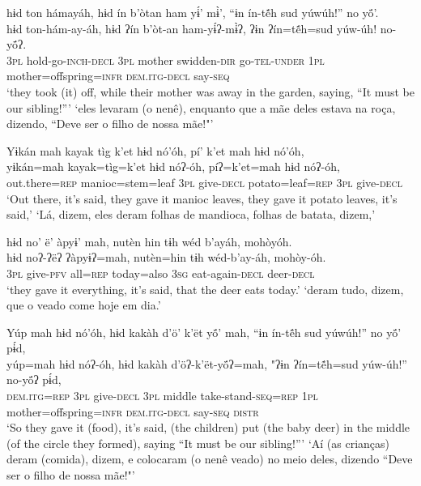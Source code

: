 \documentclass[output=paper,
modfonts,nonflat
]{langsci/langscibook}
\begin{document}
\ea  hɨd ton hámayáh, hɨd ín b’òtan ham yɨ́’ mɨ̀’, “ɨn ín-tẽ́h sud yúwúh!” no yö́’.\\
\gll hɨd ton-hám-ay-áh, hɨd ʔín b’òt-an ham-yɨ́ʔ-mɨ̀ʔ, ʔɨn ʔín=tẽ́h=sud yúw-úh! no-yö́ʔ.\\
     \textsc{3pl} hold-go\textsc{-inch-decl} \textsc{3pl} mother swidden\textsc{-dir} go\textsc{-tel-under} \textsc{1pl} mother=offspring\textsc{=infr} \textsc{dem.itg-decl} say\textsc{-seq}\\
\glt ‘they took (it) off, while their mother was away in the garden, saying, “It must be our sibling!”'
\glt ‘eles levaram (o nenê), enquanto que a mãe deles estava na roça, dizendo, “Deve ser o filho de nossa mãe!"'
\z 

\ea  Yɨkán mah kayak tìg k’et hɨd nó’óh, pí’ k’et mah hɨd nó’óh,\\
\gll yɨkán=mah kayak=tìg=k’et hɨd nóʔ-óh, píʔ=k’et=mah hɨd nóʔ-óh,\\
     out.there\textsc{=rep} manioc=stem=leaf \textsc{3pl} give\textsc{-decl} potato=leaf\textsc{=rep} \textsc{3pl} give\textsc{-decl}\\
\glt ‘Out there, it’s said, they gave it manioc leaves, they gave it potato leaves, it’s said,'
\glt ‘Lá, dizem, eles deram folhas de mandioca, folhas de batata, dizem,'
\z 

\ea  hɨd no’ ë’ àpyɨ’ mah, nutèn hin tɨh wéd b’ayáh, mohòyóh.\\
\gll hɨd noʔ-ʔëʔ ʔàpyɨʔ=mah, nutèn=hin tɨh wéd-b’ay-áh, mohòy-óh.\\
     \textsc{3pl} give\textsc{-pfv} all\textsc{=rep} today=also \textsc{3sg} eat-again\textsc{-decl} deer\textsc{-decl}\\
\glt ‘they gave it everything, it’s said, that the deer eats today.'
\glt ‘deram tudo, dizem, que o veado come hoje em dia.'
\z 

\ea  Yúp mah hɨd nó’óh, hɨd kakàh d’ö’ k’ët yö́’ mah, “ɨn ín-tẽ́h sud yúwúh!” no yö́’ pɨ́d,\\
\gll yúp=mah hɨd nóʔ-óh, hɨd kakàh d’öʔ-k’ët-yö́ʔ=mah, "ʔɨn ʔín=tẽ́h=sud yúw-úh!” no-yö́ʔ pɨ́d,\\
     \textsc{dem.itg=rep} \textsc{3pl} give\textsc{-decl} \textsc{3pl} middle take-stand\textsc{-seq=rep} \textsc{1pl} mother=offspring\textsc{=infr} \textsc{dem.itg-decl} say\textsc{-seq} \textsc{distr}\\
\glt ‘So they gave it (food), it’s said, (the children) put (the baby deer) in the middle (of the circle they formed), saying “It must be our sibling!”'
\glt ‘Aí (as crianças) deram (comida), dizem, e colocaram (o nenê veado) no meio deles, dizendo “Deve ser o filho de nossa mãe!"'
\z 
\end{document}
